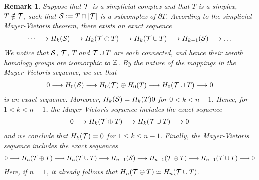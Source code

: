 \documentclass[a4paper]{article}
\newtheorem{remark}{Remark}
\begin{document}
\begin{remark}
    Suppose that ${\mathcal T}$ is a simplicial complex and that $T$ is a simplex, $T \notin {\mathcal T}$, such that ${\mathcal S} := T \cap |{\mathcal T}|$ is a subcomplex of $\partial T$. 
    According to the simplicial Mayer-Vietoris theorem, there exists an exact sequence 
    \begin{align*}
        \begin{CD}
            \dots \longrightarrow H_{k}(\calS) \longrightarrow H_{k}(\calT \oplus T) \longrightarrow H_{k}(\calT \cup T) \longrightarrow H_{k-1}(\calS) \longrightarrow\dots 
        \end{CD}
    \end{align*}
    We notice that ${\mathcal S}$, ${\mathcal T}$, $T$ and ${\mathcal T} \cup T$ are each connected, and hence their zeroth homology groups are isomorphic to ${\mathbb Z}$. 
    By the nature of the mappings in the Mayer-Vietoris sequence, we see that 
    \begin{align*}
        \begin{CD}
            0 \longrightarrow H_{0}(\calS) \longrightarrow H_{0}(\calT) \oplus H_{0}(T) \longrightarrow H_{0}(\calT \cup T) \longrightarrow 0 
        \end{CD}
    \end{align*}
    is an exact sequence. 
    Moreover, $H_{k}({\mathcal S}) = H_{k}(T) 0$ for $0 < k < n-1$. Hence, for $1 < k < n-1$,
    the Mayer-Vietoris sequence includes the exact sequence 
    \begin{align*}
        \begin{CD}
            0 \longrightarrow H_{k}(\calT \oplus T) \longrightarrow H_{k}(\calT \cup T) \longrightarrow 0 
        \end{CD}
    \end{align*}
    and we conclude that $H_{k}({\mathcal T}) = 0$ for $1 \leq k \leq n-1$.
    Finally, the Mayer-Vietoris sequence includes the exact sequences 
    \begin{align*}
        \begin{CD}
            0 \longrightarrow H_{n}(\calT \oplus T) \longrightarrow H_{n}(\calT \cup T) \longrightarrow H_{n-1}(\calS) \longrightarrow H_{n-1}(\calT \oplus T) \longrightarrow H_{n-1}(\calT \cup T) \longrightarrow 0 
        \end{CD}
    \end{align*}
    Here, if $n=1$, it already follows that $H_{n}({\mathcal T} \oplus T) \simeq H_{n}({\mathcal T} \cup T)$.

\end{remark}
\end{document}
